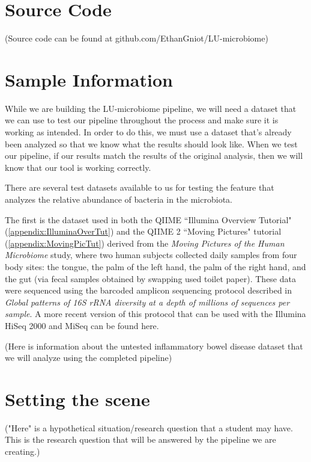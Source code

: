 \chapter{Source Code}
(Source code can be found at github.com/EthanGniot/LU-microbiome)

\chapter{Sample Information}

While we are building the LU-microbiome pipeline, we will need a dataset that we can use to test our pipeline throughout the process and make sure it is working as intended. In order to do this, we must use a dataset that's already been analyzed so that we know what the results should look like. When we test our pipeline, if our results match the results of the original analysis, then we will know that our tool is working correctly.

There are several test datasets available to us for testing the feature that analyzes the relative abundance of bacteria in the microbiota.

The first is the dataset used in both the QIIME ``Illumina Overview Tutorial" (\ref{appendix:IlluminaOverTut})  and the QIIME 2 ``Moving Pictures" tutorial (\ref{appendix:MovingPicTut}) derived from the  \textit{Moving Pictures of the Human Microbiome} study, where two human subjects collected daily samples from four body sites: the tongue, the palm of the left hand, the palm of the right hand, and the gut (via fecal samples obtained by swapping used toilet paper). These data were sequenced using the barcoded amplicon sequencing protocol described in  \textit{Global patterns of 16S rRNA diversity at a depth of millions of sequences per sample}. A more recent version of this protocol that can be used with the Illumina HiSeq 2000 and MiSeq can be found here. 

(Here is information about the untested inflammatory bowel disease dataset that we will analyze using the completed pipeline)

\chapter{Setting the scene}
    \label{chap:scene}
("Here" is a hypothetical situation/research question that a student may have. This is the research question that will be answered by the pipeline we are creating.)

